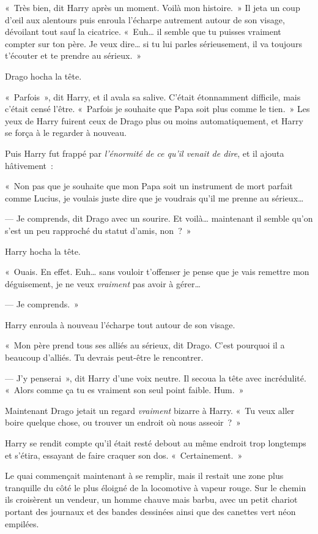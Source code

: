 «~Très bien, dit Harry après un moment. Voilà mon histoire.~» Il jeta un coup d'œil aux alentours puis enroula l'écharpe autrement autour de son visage, dévoilant tout sauf la cicatrice. «~Euh… il semble que tu puisses vraiment compter sur ton père. Je veux dire… si tu lui parles sérieusement, il va toujours t'écouter et te prendre au sérieux.~»

Drago hocha la tête.

«~Parfois~», dit Harry, et il avala sa salive. C'était étonnamment difficile, mais c'était censé l'être. «~Parfois je souhaite que Papa soit plus comme le tien.~» Les yeux de Harry fuirent ceux de Drago plus ou moins automatiquement, et Harry se força à le regarder à nouveau.

Puis Harry fut frappé par \emph{l'énormité de ce qu'il venait de dire}, et il ajouta hâtivement~:

«~Non pas que je souhaite que mon Papa soit un instrument de mort parfait comme Lucius, je voulais juste dire que je voudrais qu'il me prenne au sérieux…

--- Je comprends, dit Drago avec un sourire. Et voilà… maintenant il semble qu'on s'est un peu rapproché du statut d'amis, non~?~»

Harry hocha la tête.

«~Ouais. En effet. Euh… sans vouloir t'offenser je pense que je vais remettre mon déguisement, je ne veux \emph{vraiment} pas avoir à gérer…

--- Je comprends.~»

Harry enroula à nouveau l'écharpe tout autour de son visage.

«~Mon père prend tous ses alliés au sérieux, dit Drago. C'est pourquoi il a beaucoup d'alliés. Tu devrais peut-être le rencontrer.

--- J'y penserai~», dit Harry d'une voix neutre. Il secoua la tête avec incrédulité. «~Alors comme ça tu es vraiment son seul point faible. Hum.~»

Maintenant Drago jetait un regard \emph{vraiment} bizarre à Harry. «~Tu veux aller boire quelque chose, ou trouver un endroit où nous asseoir~?~»

Harry se rendit compte qu'il était resté debout au même endroit trop longtemps et s'étira, essayant de faire craquer son dos. «~Certainement.~»

Le quai commençait maintenant à se remplir, mais il restait une zone plus tranquille du côté le plus éloigné de la locomotive à vapeur rouge. Sur le chemin ils croisèrent un vendeur, un homme chauve mais barbu, avec un petit chariot portant des journaux et des bandes dessinées ainsi que des canettes vert néon empilées.

